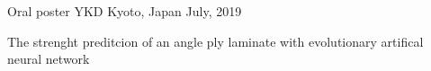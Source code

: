 

\begin{cventries}

  \cventry
  	{Oral poster}
    {YKD} %
    {Kyoto, Japan} %
    {July, 2019} %
    {
      \begin{cvitems} %
	  \item {The strenght preditcion of an angle ply laminate with evolutionary
		  artifical neural network}
      \end{cvitems}
    }


\end{cventries}
